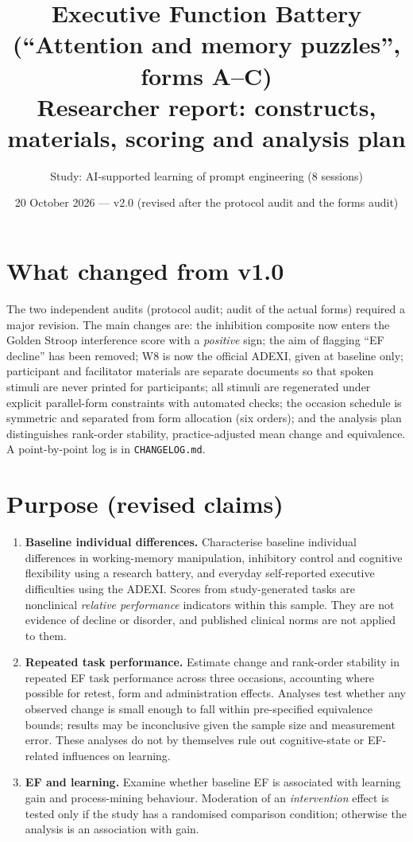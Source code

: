 \documentclass[11pt,a4paper]{article}
\begin{document}
\sloppy
\title{Executive Function Battery (``Attention and memory puzzles'', forms A--C)\\\large Researcher report: constructs, materials, scoring and analysis plan}
\author{Study: AI-supported learning of prompt engineering (8 sessions)}
\date{20 October 2026 --- v2.0 (revised after the protocol audit and the forms audit)}
\maketitle

\section*{What changed from v1.0}
The two independent audits (protocol audit; audit of the actual forms) required a major revision. The main changes are: the inhibition composite now enters the Golden Stroop interference score with a \emph{positive} sign; the aim of flagging ``EF decline'' has been removed; W8 is now the official ADEXI, given at baseline only; participant and facilitator materials are separate documents so that spoken stimuli are never printed for participants; all stimuli are regenerated under explicit parallel-form constraints with automated checks; the occasion schedule is symmetric and separated from form allocation (six orders); and the analysis plan distinguishes rank-order stability, practice-adjusted mean change and equivalence. A point-by-point log is in \texttt{CHANGELOG.md}.

\section*{Purpose (revised claims)}
\begin{enumerate}[label=(\alph*)]
\item \textbf{Baseline individual differences.} Characterise baseline individual differences in working-memory manipulation, inhibitory control and cognitive flexibility using a research battery, and everyday self-reported executive difficulties using the ADEXI. Scores from study-generated tasks are nonclinical \emph{relative performance} indicators within this sample. They are not evidence of decline or disorder, and published clinical norms are not applied to them.
\item \textbf{Repeated task performance.} Estimate change and rank-order stability in repeated EF task performance across three occasions, accounting where possible for retest, form and administration effects. Analyses test whether any observed change is small enough to fall within pre-specified equivalence bounds; results may be inconclusive given the sample size and measurement error. These analyses do not by themselves rule out cognitive-state or EF-related influences on learning.
\item \textbf{EF and learning.} Examine whether baseline EF is associated with learning gain and process-mining behaviour. Moderation of an \emph{intervention} effect is tested only if the study has a randomised comparison condition; otherwise the analysis is an association with gain.
\end{enumerate}
\end{document}
